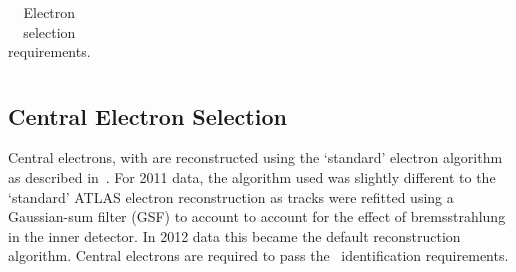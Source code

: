\begin{table}[]
\begin{tabular}{ l  l l }
    \hline \hline
  \end{tabular}
   \caption{Electron selection requirements.}
   \label{table:objsel-el}
\end{table}

\subsection{Central Electron Selection}

Central electrons, with  are reconstructed using the
`standard' electron algorithm as described in~.  For 2011
data, the algorithm used was slightly different to the `standard' ATLAS electron
reconstruction as tracks were refitted using a Gaussian-sum filter (GSF) to
account to account for the effect of bremsstrahlung in the inner detector. In
2012 data this became the default reconstruction algorithm. Central electrons
are required to pass the \loosePP\ identification requirements.

